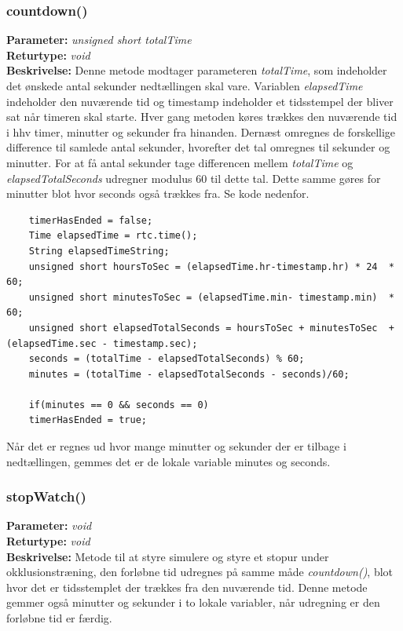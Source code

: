 \subsubsection{countdown()}
\textbf{Parameter: } \textit{unsigned short totalTime}
\\ \textbf{Returtype: } \textit{void}
\\ \textbf{Beskrivelse: } Denne metode modtager parameteren \textit{totalTime}, som indeholder det ønskede antal sekunder nedtællingen skal vare. Variablen \textit{elapsedTime} indeholder den nuværende tid og timestamp indeholder et tidsstempel der bliver sat når timeren skal starte. Hver gang metoden køres trækkes den nuværende tid i hhv timer, minutter og sekunder fra hinanden. Dernæst omregnes de forskellige difference til samlede antal sekunder, hvorefter det tal omregnes til sekunder og minutter. For at få antal sekunder tage differencen mellem \textit{totalTime} og \textit{elapsedTotalSeconds} udregner modulus 60 til dette tal. Dette samme gøres for minutter blot hvor seconds også trækkes fra. Se kode nedenfor. 
\begin{lstlisting}
	timerHasEnded = false;
	Time elapsedTime = rtc.time();
	String elapsedTimeString;
	unsigned short hoursToSec = (elapsedTime.hr-timestamp.hr) * 24	* 60;
	unsigned short minutesToSec = (elapsedTime.min- timestamp.min)	* 60;
	unsigned short elapsedTotalSeconds = hoursToSec + minutesToSec	+ (elapsedTime.sec - timestamp.sec);
	seconds = (totalTime - elapsedTotalSeconds) % 60;
	minutes = (totalTime - elapsedTotalSeconds - seconds)/60;
	
	if(minutes == 0 && seconds == 0)
	timerHasEnded = true;
\end{lstlisting}
Når det er regnes ud hvor mange minutter og sekunder der er tilbage i nedtællingen, gemmes det er de lokale variable minutes og seconds. 

\subsubsection{stopWatch()}
\textbf{Parameter: } \textit{void}
\\ \textbf{Returtype: } \textit{void}
\\ \textbf{Beskrivelse: } Metode til at styre simulere og styre et stopur under okklusionstræning, den forløbne tid udregnes på samme måde \textit{countdown()}, blot hvor det er tidsstemplet der trækkes fra den nuværende tid. Denne metode gemmer også minutter og sekunder i to lokale variabler, når udregning er den forløbne tid er færdig. 

